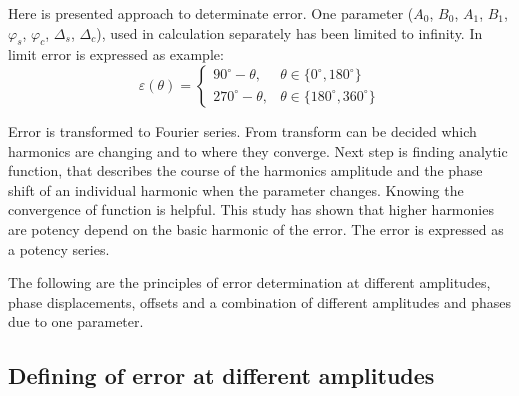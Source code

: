 \documentclass[a4paper]{article}
\begin{document}
Here is presented approach to determinate error. One parameter ($A_0$, $B_0$, $A_1$, $B_1$, $\varphi_{s}$, $\varphi_{c}$, $\Delta_s$, $\Delta_c$), used in calculation separately has been limited to infinity.
In limit error is expressed as example:
\begin{equation}
\label{equ:def_err_inf}
\varepsilon(\theta)=
\begin{cases}
90^\circ-\theta, & \theta \in \{0^\circ,180^\circ\}\\
270^\circ-\theta, & \theta \in \{180^\circ,360^\circ\}
\end{cases}
\end{equation}

Error is transformed to Fourier series. From transform can be decided which harmonics are changing and to where they converge. Next step is finding analytic function, that describes the course of the harmonics amplitude and the phase shift of an individual harmonic when the parameter changes. Knowing the convergence of function is helpful. This study has shown that higher harmonies are potency depend on the basic harmonic of the error. The error is expressed as a potency series.

The following are the principles of error determination at different amplitudes, phase displacements, offsets and a combination of different amplitudes and phases due to one parameter.

\subsection{Defining of error at different amplitudes}
\end{document}
